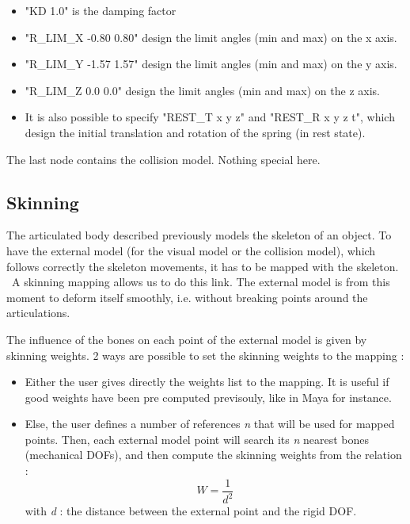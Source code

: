 \begin{itemize}
\begin{itemize}
			\item "KD 1.0" is the damping factor
			\item "R\_LIM\_X -0.80 0.80" design the limit angles (min and  max) on the x axis.
			\item "R\_LIM\_Y -1.57 1.57" design the limit angles (min and  max) on the y axis.
			\item "R\_LIM\_Z  0.0  0.0" design the limit angles (min and  max) on the z axis.
			\item It is also possible to specify "REST\_T x y z" and "REST\_R x y z t", which design the initial translation and rotation of the spring (in rest state).
		\end{itemize}
\end{itemize}

The last node contains the collision model. Nothing special here.


\subsection{Skinning}

The articulated body described previously models the skeleton of an object.
To have the external model (for the visual model or the collision model), which follows correctly the skeleton movements, it has to be mapped with the skeleton. 
\ 
A skinning mapping allows us to do this link. The external model is from this moment to deform itself smoothly, i.e. without breaking points around the articulations.

The influence of the bones on each point of the external model is given by skinning weights.
2 ways are possible to set the skinning weights to the mapping :
\begin{itemize}
	\item Either the user gives directly the weights list to the mapping. It is useful if good weights have been pre computed previsouly, like in Maya for instance.
	\item Else, the user defines a number of references \textsl{n} that will be used for mapped points. Then, each external model point will search its \textsl{n} nearest bones (mechanical DOFs), and then compute the skinning weights from the relation :
\[ W = \frac{1}{d^{2}}  \]
\small{ with \textsl{d} : the distance between the external point and the rigid DOF.}
\end{itemize}

